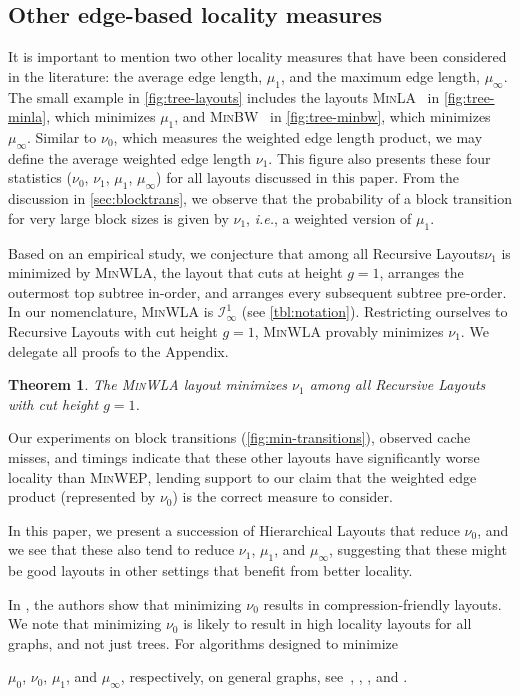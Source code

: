 \documentclass[10pt,conference,letterpaper]{IEEEtran}
\newtheorem{theorem}{Theorem}
\newcommand{\note}[1]{}
\newcommand{\HLs}{Hierarchical Layouts\xspace}
\newcommand{\RLs}{Recursive Layouts\xspace}
\newcommand{\IN}{\ensuremath{\mathcal{I}}\xspace}
\newcommand{\ie}{{\it i.e.}\xspace}
\newcommand{\pmean}[1][p]{\ensuremath{\mu_{#1}}\xspace}
\newcommand{\pwmean}[1][p]{\ensuremath{\nu_{#1}}\xspace}
\newcommand{\minbw}{\textsc{MinBW}\xspace}
\newcommand{\minla}{\textsc{MinLA}\xspace}
\newcommand{\minwla}{\textsc{MinWLA}\xspace}
\newcommand{\minwep}{\textsc{MinWEP}\xspace}
\begin{document}
\subsection{Other edge-based locality measures}

It is important to mention two other locality measures that
have been considered in the literature: the average edge
length, \pmean[1], and the maximum edge length, \pmean[\infty].
The small example in \autoref{fig:tree-layouts} 
includes the layouts \minla~\cite{Chung:MinLA} in
\autoref{fig:tree-minla}, which minimizes \pmean[1], and
\minbw~\cite{Heckmann:MinBW} in \autoref{fig:tree-minbw}, which
minimizes \pmean[\infty].  
Similar to \pwmean[0], which measures the weighted edge
length product, we may define the average weighted edge length \pwmean[1].
This figure also presents 
these four statistics
(\pwmean[0], \pwmean[1], \pmean[1], \pmean[\infty]) for 
all layouts discussed in this paper. 
From the discussion in \autoref{sec:blocktrans}, we observe that the
probability of a block transition for very large block sizes is given
by \pwmean[1], \ie, a weighted version of \pmean[1]. 

Based on an empirical study, we conjecture that among all \RLs \pwmean[1] is minimized by \minwla, the layout that
cuts at height $g=1$, arranges the outermost top subtree in-order, and
arranges every subsequent subtree pre-order.
In our nomenclature, \minwla is $\IN^1_\infty$ (see \autoref{tbl:notation}).
Restricting ourselves to \RLs with cut height $g=1$, \minwla provably minimizes \pwmean[1].
We delegate all proofs to the 
Appendix.
\begin{theorem}
\label{thm:minwla}
The \minwla layout minimizes \pwmean[1] among all \RLs with cut height $g=1$.
\end{theorem}

Our experiments on block transitions
(\autoref{fig:min-transitions}), observed cache misses, and timings
indicate that these other layouts have significantly
worse locality than \minwep, lending support to our claim that
the weighted edge product (represented by \pwmean[0]) is the correct
measure to consider. 

In this paper, we present a succession of \HLs that reduce \pwmean[0],
and we see that these also tend to reduce \pwmean[1], \pmean[1], and
\pmean[\infty], suggesting that these might be good layouts in other
settings that benefit from better locality. 
\note{In fact, \cite{Safro11} minimizes \pwmean[0]. Added sentences.}
In \cite{Safro11}, the authors show that minimizing \pwmean[0]
results in compression-friendly layouts.
We note that minimizing \pwmean[0] is likely to result in high locality layouts 
for all graphs, and not just trees. 
For algorithms designed to minimize
\note{Have we defined \pmean[0]? Defined earlier.}
\pmean[0], \pwmean[0], \pmean[1], and \pmean[\infty], respectively, on general graphs,
see~\cite{Yoon06}, \cite{Safro11}, \cite{Safro09}, and \cite{Cuthill:minbw}.
\end{document}
